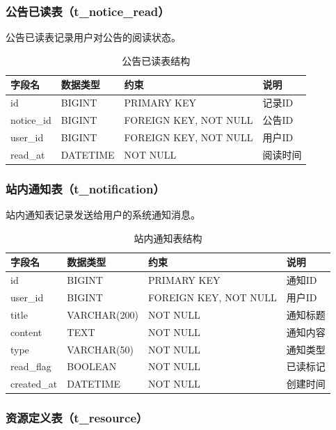 \subsubsection{公告已读表（t\_notice\_read）}

公告已读表记录用户对公告的阅读状态。

\begin{table}[H]
\centering
\caption{公告已读表结构}
\begin{tabular}{llll}
\toprule
字段名 & 数据类型 & 约束 & 说明 \\
\midrule
id & BIGINT & PRIMARY KEY & 记录ID \\
notice\_id & BIGINT & FOREIGN KEY, NOT NULL & 公告ID \\
user\_id & BIGINT & FOREIGN KEY, NOT NULL & 用户ID \\
read\_at & DATETIME & NOT NULL & 阅读时间 \\
\bottomrule
\end{tabular}
\end{table}

\subsubsection{站内通知表（t\_notification）}

站内通知表记录发送给用户的系统通知消息。

\begin{table}[H]
\centering
\caption{站内通知表结构}
\begin{tabular}{llll}
\toprule
字段名 & 数据类型 & 约束 & 说明 \\
\midrule
id & BIGINT & PRIMARY KEY & 通知ID \\
user\_id & BIGINT & FOREIGN KEY, NOT NULL & 用户ID \\
title & VARCHAR(200) & NOT NULL & 通知标题 \\
content & TEXT & NOT NULL & 通知内容 \\
type & VARCHAR(50) & NOT NULL & 通知类型 \\
read\_flag & BOOLEAN & NOT NULL & 已读标记 \\
created\_at & DATETIME & NOT NULL & 创建时间 \\
\bottomrule
\end{tabular}
\end{table}

\subsubsection{资源定义表（t\_resource）}

